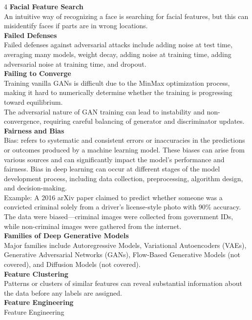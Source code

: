 \documentclass[8pt]{extarticle}
\begin{document}
\begin{multicols}{4}
\vspace{2pt}\textbf{Facial Feature Search}\\
An intuitive way of recognizing a face is searching for facial features, but this can misidentify faces if parts are in wrong locations.\\
\vspace{2pt}\textbf{Failed Defenses}\\
Failed defenses against adversarial attacks include adding noise at test time, averaging many models, weight decay, adding noise at training time, adding adversarial noise at training time, and dropout.\\
\vspace{2pt}\textbf{Failing to Converge}\\
Training vanilla GANs is difficult due to the MinMax optimization process, making it hard to numerically determine whether the training is progressing toward equilibrium.\\
The adversarial nature of GAN training can lead to instability and non-convergence, requiring careful balancing of generator and discriminator updates.\\
\vspace{2pt}\textbf{Fairness and Bias}\\
Bias: refers to systematic and consistent errors or inaccuracies in the predictions or outcomes produced by a machine learning model. These biases can arise from various sources and can significantly impact the model's performance and fairness. Bias in deep learning can occur at different stages of the model development process, including data collection, preprocessing, algorithm design, and decision-making.\\
Example: A 2016 arXiv paper claimed to predict whether someone was a convicted criminal solely from a driver's license-style photo with 90\% accuracy. The data were biased---criminal images were collected from government IDs, while non-criminal images were gathered from the internet.\\
\vspace{2pt}\textbf{Families of Deep Generative Models}\\
Major families include Autoregressive Models, Variational Autoencoders (VAEs), Generative Adversarial Networks (GANs), Flow-Based Generative Models (not covered), and Diffusion Models (not covered).\\
\vspace{2pt}\textbf{Feature Clustering}\\
Patterns or clusters of similar features can reveal substantial information about the data before any labels are assigned.\\
\vspace{2pt}\textbf{Feature Engineering}\\
Feature Engineering\\


\end{multicols}
\end{document}
